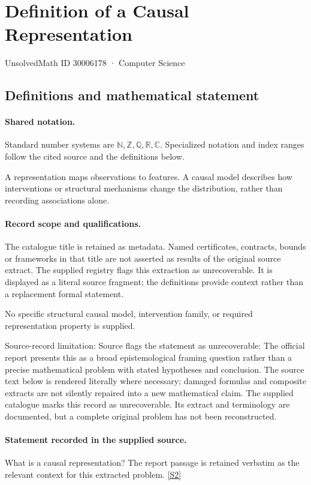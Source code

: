 \documentclass[11pt]{article}
\newcommand{\sref}[2]{\hyperlink{source:#1:#2}{[S#2]}}
\begin{document}
\setcounter{section}{30006177}
\section{Definition of a Causal Representation}\label{30006178}
{\small\sffamily UnsolvedMath ID 30006178 · Computer Science}
\subsection{Definitions and mathematical statement}

\paragraph{Shared notation.}Standard number systems are $\mathbb N,\mathbb Z,\mathbb Q,\mathbb R,\mathbb C$. Specialized notation and index ranges follow the cited source and the definitions below.


A representation maps observations to features. A causal model describes how interventions or structural mechanisms change the distribution, rather than recording associations alone.
\paragraph{Record scope and qualifications.}
The catalogue title is retained as metadata. Named certificates, contracts, bounds or frameworks in that title are not asserted as results of the original source extract.
The supplied registry flags this extraction as unrecoverable. It is displayed as a literal source fragment; the definitions provide context rather than a replacement formal statement.

No specific structural causal model, intervention family, or required representation property is supplied.

Source-record limitation: Source flags the statement as unrecoverable: The official report presents this as a broad epistemological framing question rather than a precise mathematical problem with stated hypotheses and conclusion.
The source text below is rendered literally where necessary; damaged formulas and composite extracts are not silently repaired into a new mathematical claim.
The supplied catalogue marks this record as unrecoverable. Its extract and terminology are documented, but a complete original problem has not been reconstructed.
\paragraph{Statement recorded in the supplied source.}
What is a causal representation? The report passage is retained verbatim as the relevant context for this extracted problem. \sref{30006178}{2}
\end{document}
